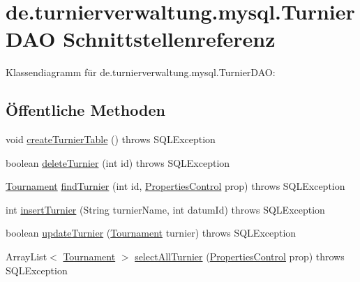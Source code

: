 \hypertarget{interfacede_1_1turnierverwaltung_1_1mysql_1_1_turnier_d_a_o}{}\section{de.\+turnierverwaltung.\+mysql.\+Turnier\+D\+AO Schnittstellenreferenz}
\label{interfacede_1_1turnierverwaltung_1_1mysql_1_1_turnier_d_a_o}


Klassendiagramm für de.\+turnierverwaltung.\+mysql.\+Turnier\+D\+AO\+:
\subsection*{Öffentliche Methoden}
\begin{DoxyCompactItemize}
\item 
void \hyperlink{interfacede_1_1turnierverwaltung_1_1mysql_1_1_turnier_d_a_o_ad3f5dfff019efe58744b0c7bb6c183bb}{create\+Turnier\+Table} ()  throws S\+Q\+L\+Exception
\item 
boolean \hyperlink{interfacede_1_1turnierverwaltung_1_1mysql_1_1_turnier_d_a_o_a66345e5fb5a16629897a15c8eb2e2af8}{delete\+Turnier} (int id)  throws S\+Q\+L\+Exception
\item 
\hyperlink{classde_1_1turnierverwaltung_1_1model_1_1_tournament}{Tournament} \hyperlink{interfacede_1_1turnierverwaltung_1_1mysql_1_1_turnier_d_a_o_a61a6d9383f880775fc27bf40e94eab01}{find\+Turnier} (int id, \hyperlink{classde_1_1turnierverwaltung_1_1control_1_1_properties_control}{Properties\+Control} prop)  throws S\+Q\+L\+Exception
\item 
int \hyperlink{interfacede_1_1turnierverwaltung_1_1mysql_1_1_turnier_d_a_o_ab9bf622f0c268c762bfd78a9564a1800}{insert\+Turnier} (String turnier\+Name, int datum\+Id)  throws S\+Q\+L\+Exception
\item 
boolean \hyperlink{interfacede_1_1turnierverwaltung_1_1mysql_1_1_turnier_d_a_o_a5a7149fd8e474a8500303a5c0b2083c3}{update\+Turnier} (\hyperlink{classde_1_1turnierverwaltung_1_1model_1_1_tournament}{Tournament} turnier)  throws S\+Q\+L\+Exception
\item 
Array\+List$<$ \hyperlink{classde_1_1turnierverwaltung_1_1model_1_1_tournament}{Tournament} $>$ \hyperlink{interfacede_1_1turnierverwaltung_1_1mysql_1_1_turnier_d_a_o_a5917a9816616b43c89689ebf32cb19b8}{select\+All\+Turnier} (\hyperlink{classde_1_1turnierverwaltung_1_1control_1_1_properties_control}{Properties\+Control} prop)  throws S\+Q\+L\+Exception
\end{DoxyCompactItemize}


